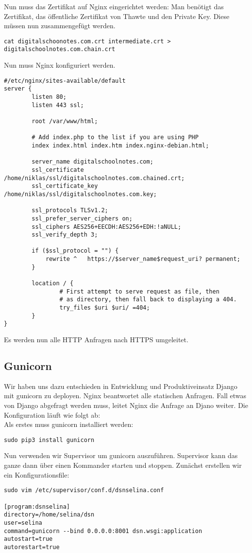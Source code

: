 \documentclass[12pt,a4paper,oneside,ngerman]{scrartcl}
\begin{document}
Nun muss das Zertifikat auf Nginx eingerichtet werden\cite{CERT:3}:
Man benötigt das Zertifikat, das öffentliche Zertifikat von Thawte und den Private Key.
Diese müssen nun zusammengefügt werden.
\begin{lstlisting}
cat digitalschoonotes.com.crt intermediate.crt > digitalschoolnotes.com.chain.crt
\end{lstlisting}
Nun muss Nginx konfiguriert werden.
\begin{lstlisting}
#/etc/nginx/sites-available/default
server {
        listen 80;
        listen 443 ssl;

        root /var/www/html;

        # Add index.php to the list if you are using PHP
        index index.html index.htm index.nginx-debian.html;

        server_name digitalschoolnotes.com;
        ssl_certificate /home/niklas/ssl/digitalschoolnotes.com.chained.crt;
        ssl_certificate_key /home/niklas/ssl/digitalschoolnotes.com.key;

        ssl_protocols TLSv1.2;
        ssl_prefer_server_ciphers on;
        ssl_ciphers AES256+EECDH:AES256+EDH:!aNULL;
        ssl_verify_depth 3;

        if ($ssl_protocol = "") {
            rewrite ^   https://$server_name$request_uri? permanent;
        }

        location / {
                # First attempt to serve request as file, then
                # as directory, then fall back to displaying a 404.
                try_files $uri $uri/ =404;
        }
}
\end{lstlisting}
Es werden nun alle HTTP Anfragen nach HTTPS umgeleitet.

\subsection{Gunicorn}
Wir haben uns dazu entschieden in Entwicklung und Produktiveinsatz Django mit gunicorn zu deployen. Nginx beantwortet alle statischen Anfragen. Fall etwas von Django abgefragt werden muss, leitet Nginx die Anfrage an Djano weiter. Die Konfiguration läuft wie folgt ab\cite{GUNICORN:1}:\\
Als erstes muss gunicorn installiert werden:
\begin{lstlisting}
sudo pip3 install gunicorn
\end{lstlisting}
Nun verwenden wir Supervisor um gunicorn\cite{GUNICORN:2} auszuführen. Supervisor kann das ganze dann über einen Kommander starten und stoppen. Zunächst erstellen wir ein Konfigurationsfile:
\begin{lstlisting}
sudo vim /etc/supervisor/conf.d/dsnselina.conf

[program:dsnselina]
directory=/home/selina/dsn
user=selina
command=gunicorn --bind 0.0.0.0:8001 dsn.wsgi:application
autostart=true
autorestart=true
\end{lstlisting}
\end{document}

